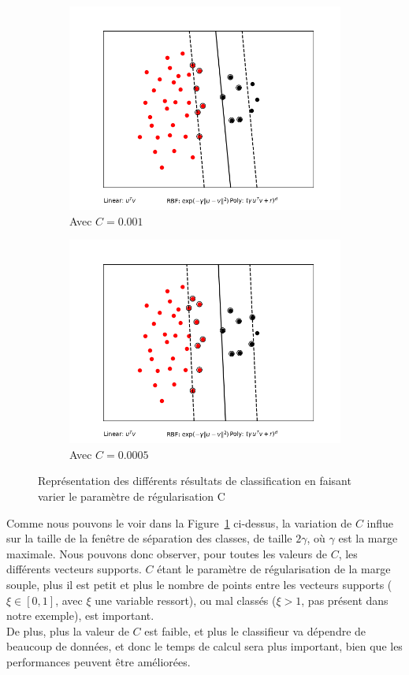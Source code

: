 \documentclass{article}
\begin{document}
\begin{figure}[H]
    \begin{subfigure}{0.45\textwidth}
        \centering
        \includegraphics[width=.7\textwidth]{outputs/SVM_C_0_001.png} 
        \caption{Avec $C=0.001$}
    \end{subfigure}
    \begin{subfigure}{0.45\textwidth}
        \centering
        \includegraphics[width=.7\textwidth]{outputs/SVM_C_0_0005.png} 
        \caption{Avec $C=0.0005$}
    \end{subfigure}

    \caption{Représentation des différents résultats de classification en faisant varier le paramètre de régularisation C}
    \label{fig:q3_var_C}
\end{figure}

Comme nous pouvons le voir dans la Figure~\ref{fig:q3_var_C} ci-dessus, la variation de $C$ influe sur la taille de la fenêtre de séparation des classes, de taille $2\gamma$, où $\gamma$ est la marge maximale. Nous pouvons donc observer, pour toutes les valeurs de $C$, les différents vecteurs supports. $C$ étant le paramètre de régularisation de la marge souple, plus il est petit et plus le nombre de points entre les vecteurs supports ($\xi\in[0,1]$, avec $\xi$ une variable ressort), ou mal classés ($\xi>1$, pas présent dans notre exemple), est important.\\
De plus, plus la valeur de $C$ est faible, et plus le classifieur va dépendre de beaucoup de données, et donc le temps de calcul sera plus important, bien que les performances peuvent être améliorées.\\
\end{document}
